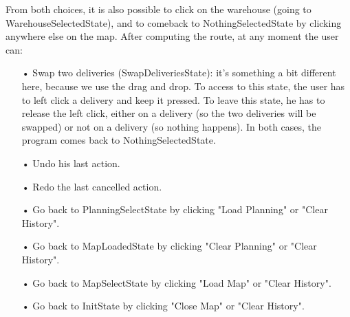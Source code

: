 \documentclass[paper=a4, fontsize=11pt]{report}
\numberwithin{equation}{section}		%
\numberwithin{figure}{section}		%
\numberwithin{table}{section}		%
\begin{document}
From both choices, it is also possible to click on the warehouse (going to WarehouseSelectedState), and to comeback to NothingSelectedState by clicking anywhere else on the map.
After computing the route, at any moment the user can:
\begin{itemize}
  \item[•] Swap two deliveries (SwapDeliveriesState): it's something a bit different here, because we use the drag and drop. To access to this state, the user has to left click a delivery and keep it pressed. To leave this state, he has to release the left click, either on a delivery (so the two deliveries will be swapped) or not on a delivery (so nothing happens). In both cases, the program comes back to NothingSelectedState.
  \item[•] Undo his last action.
  \item[•] Redo the last cancelled action.
  \item[•] Go back to PlanningSelectState by clicking "Load Planning" or "Clear History".
  \item[•] Go back to MapLoadedState by clicking "Clear Planning" or "Clear History".
  \item[•] Go back to MapSelectState by clicking "Load Map" or "Clear History".
  \item[•] Go back to InitState by clicking "Close Map" or "Clear History".
\end{itemize}
\end{document}

